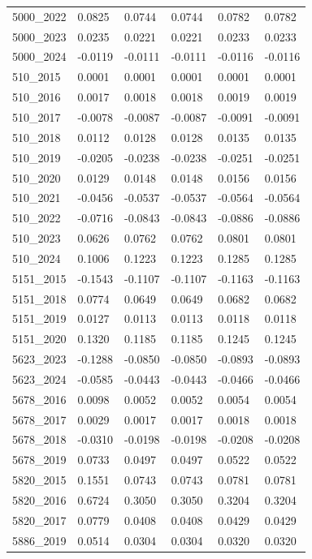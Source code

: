 \begin{table}[htbp]
\begin{tabular}{llllll}
5000_2022 & 0.0825 & 0.0744 & 0.0744 & 0.0782 & 0.0782 \\
5000_2023 & 0.0235 & 0.0221 & 0.0221 & 0.0233 & 0.0233 \\
5000_2024 & -0.0119 & -0.0111 & -0.0111 & -0.0116 & -0.0116 \\
510_2015 & 0.0001 & 0.0001 & 0.0001 & 0.0001 & 0.0001 \\
510_2016 & 0.0017 & 0.0018 & 0.0018 & 0.0019 & 0.0019 \\
510_2017 & -0.0078 & -0.0087 & -0.0087 & -0.0091 & -0.0091 \\
510_2018 & 0.0112 & 0.0128 & 0.0128 & 0.0135 & 0.0135 \\
510_2019 & -0.0205 & -0.0238 & -0.0238 & -0.0251 & -0.0251 \\
510_2020 & 0.0129 & 0.0148 & 0.0148 & 0.0156 & 0.0156 \\
510_2021 & -0.0456 & -0.0537 & -0.0537 & -0.0564 & -0.0564 \\
510_2022 & -0.0716 & -0.0843 & -0.0843 & -0.0886 & -0.0886 \\
510_2023 & 0.0626 & 0.0762 & 0.0762 & 0.0801 & 0.0801 \\
510_2024 & 0.1006 & 0.1223 & 0.1223 & 0.1285 & 0.1285 \\
5151_2015 & -0.1543 & -0.1107 & -0.1107 & -0.1163 & -0.1163 \\
5151_2018 & 0.0774 & 0.0649 & 0.0649 & 0.0682 & 0.0682 \\
5151_2019 & 0.0127 & 0.0113 & 0.0113 & 0.0118 & 0.0118 \\
5151_2020 & 0.1320 & 0.1185 & 0.1185 & 0.1245 & 0.1245 \\
5623_2023 & -0.1288 & -0.0850 & -0.0850 & -0.0893 & -0.0893 \\
5623_2024 & -0.0585 & -0.0443 & -0.0443 & -0.0466 & -0.0466 \\
5678_2016 & 0.0098 & 0.0052 & 0.0052 & 0.0054 & 0.0054 \\
5678_2017 & 0.0029 & 0.0017 & 0.0017 & 0.0018 & 0.0018 \\
5678_2018 & -0.0310 & -0.0198 & -0.0198 & -0.0208 & -0.0208 \\
5678_2019 & 0.0733 & 0.0497 & 0.0497 & 0.0522 & 0.0522 \\
5820_2015 & 0.1551 & 0.0743 & 0.0743 & 0.0781 & 0.0781 \\
5820_2016 & 0.6724 & 0.3050 & 0.3050 & 0.3204 & 0.3204 \\
5820_2017 & 0.0779 & 0.0408 & 0.0408 & 0.0429 & 0.0429 \\
5886_2019 & 0.0514 & 0.0304 & 0.0304 & 0.0320 & 0.0320 \\

\end{tabular}
\end{table}
